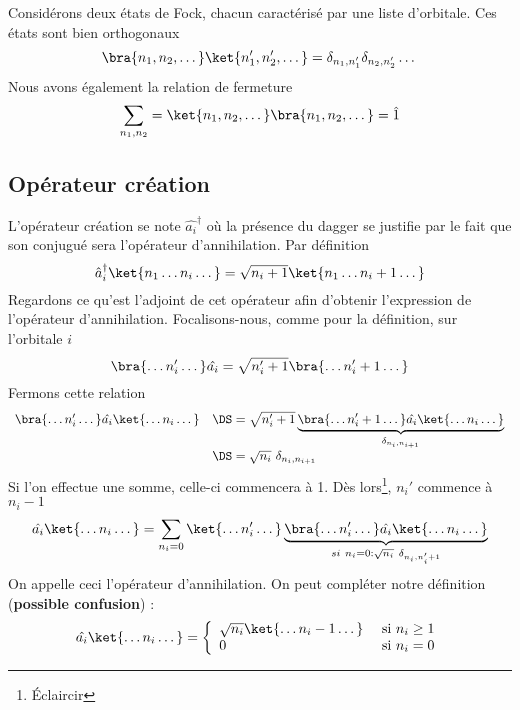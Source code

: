 Considérons deux états de Fock, chacun caractérisé par une liste d'orbitale. Ces états sont bien orthogonaux
\begin{equation}
\bra{n_1,n_2,\dots}\ket{n_1',n_2',\dots} = \delta_{n_1,n_1'}\delta_{n_2,n_2'}\dots
\end{equation}
Nous avons également la relation de fermeture
\begin{equation}
\sum_{n_1,n_2} = \ket{n_1,n_2,\dots}\bra{n_1,n_2,\dots} =\hat{1}
\end{equation}

\subsection{Opérateur création}
L'opérateur création se note $\hat{a_i}^\dagger$ où la présence du dagger se justifie par le fait que son conjugué sera 
l'opérateur d'annihilation. Par définition
\begin{equation}
\hat{a}_i^\dagger \ket{n_1\dots n_i\dots} = \sqrt{n_i+1}\ket{n_1\dots n_i+1\dots}
\end{equation}
Regardons ce qu'est l'adjoint de cet opérateur afin d'obtenir l'expression de l’opérateur d'annihilation. Focalisons-nous, 
comme pour la définition, sur l'orbitale $i$
\begin{equation}
\bra{\dots n_i'\dots}\hat{a_i} = \sqrt{n_i'+1}\bra{\dots n_i'+1\dots}
\end{equation}
Fermons cette relation
\begin{equation}
\begin{array}{ll}
\bra{\dots n_i'\dots} \hat{a_i}\ket{\dots n_i\dots} &\DS= \sqrt{n_i'+1}\underbrace{\bra{\dots n_i'+1\dots} \hat{a_i}\ket{\dots
 n_i\dots}}_{
\delta_{n_i,n_{i+1}}}\\
&\DS= \sqrt{n_i}\ \delta_{n_i,n_{i+1}}
\end{array}
\end{equation}
Si l'on effectue une somme, celle-ci commencera à 1. Dès lors\footnote{Éclaircir}, $n_i'$ commence à $n_i-1$ 
\begin{equation}
\hat{a_i}\ket{\dots n_i\dots} = \sum_{n_i=0}\ket{\dots n_i'\dots}\underbrace{\bra{\dots n_i'\dots}\hat{a_i}\ket{\dots n_i\dots}}_{
si\ n_i=0 : \sqrt{n_i}\ \delta_{n_i, n_i'+1}}
\end{equation}
On appelle ceci l'opérateur d'annihilation. On peut compléter notre définition (\textbf{possible confusion}) :
\begin{equation}
\hat{a_i}\ket{\dots n_i\dots} = \left\{\begin{array}{ll}
\sqrt{n_i}\ket{\dots n_i-1\dots} & \text{ si } n_i\geq 1\\
0 & \text{ si } n_i = 0
\end{array}\right.
\end{equation}
